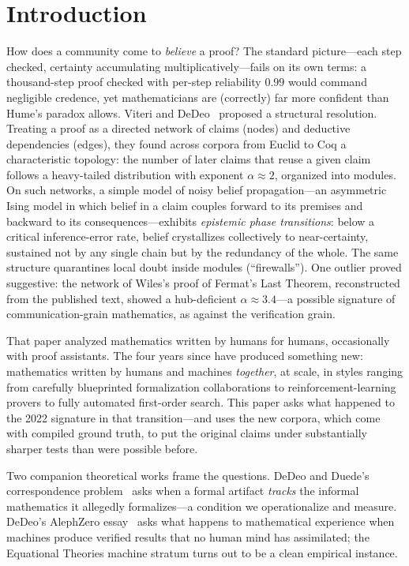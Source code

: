 \documentclass[11pt]{article}
\begin{document}
\section{Introduction}

How does a community come to \emph{believe} a proof? The standard picture---each step checked,
certainty accumulating multiplicatively---fails on its own terms: a thousand-step proof checked
with per-step reliability $0.99$ would command negligible credence, yet mathematicians are
(correctly) far more confident than Hume's paradox allows. Viteri and DeDeo~\cite{viteri2022}
proposed a structural resolution. Treating a proof as a directed network of claims (nodes) and
deductive dependencies (edges), they found across corpora from Euclid to Coq a characteristic
topology: the number of later claims that reuse a given claim follows a heavy-tailed distribution
with exponent $\alpha \approx 2$, organized into modules. On such networks, a simple model of
noisy belief propagation---an asymmetric Ising model in which belief in a claim couples forward
to its premises and backward to its consequences---exhibits \emph{epistemic phase transitions}:
below a critical inference-error rate, belief crystallizes collectively to near-certainty,
sustained not by any single chain but by the redundancy of the whole. The same structure
quarantines local doubt inside modules (``firewalls''). One outlier proved suggestive: the
network of Wiles's proof of Fermat's Last Theorem, reconstructed from the published text, showed
a hub-deficient $\alpha \approx 3.4$---a possible signature of communication-grain mathematics,
as against the verification grain.

That paper analyzed mathematics written by humans for humans, occasionally with proof
assistants. The four years since have produced something new: mathematics written by humans and
machines \emph{together}, at scale, in styles ranging from carefully blueprinted formalization
collaborations to reinforcement-learning provers to fully automated first-order search. This
paper asks what happened to the 2022 signature in that transition---and uses the new corpora,
which come with compiled ground truth, to put the original claims under substantially sharper
tests than were possible before.

Two companion theoretical works frame the questions. DeDeo and Duede's correspondence
problem~\cite{dedeo2026} asks when a formal artifact \emph{tracks} the informal mathematics it
allegedly formalizes---a condition we operationalize and measure. DeDeo's
AlephZero essay~\cite{dedeo2024} asks what happens to mathematical experience when machines
produce verified results that no human mind has assimilated; the Equational Theories machine
stratum turns out to be a clean empirical instance.
\end{document}

